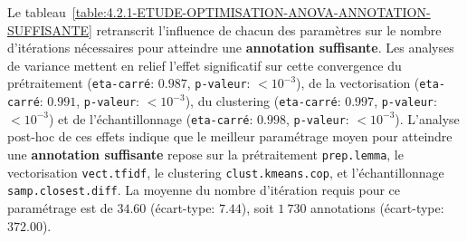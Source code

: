 			Le tableau~\ref{table:4.2.1-ETUDE-OPTIMISATION-ANOVA-ANNOTATION-SUFFISANTE} retranscrit l'influence de chacun des paramètres sur le nombre d'itérations nécessaires pour atteindre une \textbf{annotation suffisante}.
			Les analyses de variance mettent en relief l'effet significatif sur cette convergence du prétraitement (\texttt{eta-carré}: $0.987$, \texttt{p-valeur}: $< 10^{-3}$), de la vectorisation (\texttt{eta-carré}: $0.991$, \texttt{p-valeur}: $< 10^{-3}$), du clustering (\texttt{eta-carré}: $0.997$, \texttt{p-valeur}: $< 10^{-3}$) et de l'échantillonnage (\texttt{eta-carré}: $0.998$, \texttt{p-valeur}: $< 10^{-3}$).
			L'analyse post-hoc de ces effets indique que le meilleur paramétrage moyen pour atteindre une \textbf{annotation suffisante} repose sur la prétraitement \texttt{prep.lemma}, le vectorisation \texttt{vect.tfidf}, le clustering \texttt{clust.kmeans.cop}, et l'échantillonnage \texttt{samp.closest.diff}. La moyenne du nombre d'itération requis pour ce paramétrage est de $34.60$ (écart-type: $7.44$), soit $1~730$ annotations (écart-type: $372.00$).
